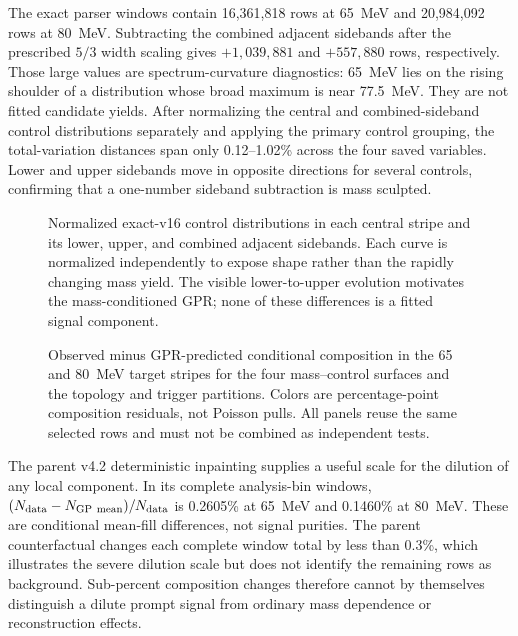 The exact parser windows contain 16,361,818 rows at 65~MeV and 20,984,092 rows
at 80~MeV.  Subtracting the combined adjacent sidebands after the prescribed
$5/3$ width scaling gives $+1,039,881$ and $+557,880$ rows, respectively.
Those large values are spectrum-curvature diagnostics: 65~MeV lies on the
rising shoulder of a distribution whose broad maximum is near 77.5~MeV.
They are not fitted candidate yields.  After normalizing the central and
combined-sideband control distributions separately and applying the primary
control grouping, the total-variation distances span only 0.12--1.02\% across
the four saved variables.  Lower and
upper sidebands move in opposite directions for several controls, confirming
that a one-number sideband subtraction is mass sculpted.

\begin{figure}[H]
\centering
{}
\caption{Normalized exact-v16 control distributions in each central stripe
and its lower, upper, and combined adjacent sidebands.  Each curve is
normalized independently to expose shape rather than the rapidly changing
mass yield.  The visible lower-to-upper evolution motivates the
mass-conditioned GPR; none of these differences is a fitted signal
component.}
\label{fig:v4p3-central-sideband-controls}
\end{figure}

\begin{figure}[H]
\centering
{}
\caption{Observed minus GPR-predicted conditional composition in the 65 and
80~MeV target stripes for the four mass--control surfaces and the topology and
trigger partitions.  Colors are percentage-point composition residuals, not
Poisson pulls.  All panels reuse the same selected rows and must not be
combined as independent tests.}
\label{fig:v4p3-conditional-residual-atlas}
\end{figure}

The parent v4.2 deterministic inpainting supplies a useful scale for the
dilution of any local component.  In its complete analysis-bin windows,
$(N_{\rm data}-N_{\rm GP\ mean})/N_{\rm data}$ is 0.2605\% at 65~MeV and
0.1460\% at 80~MeV.  These are conditional mean-fill differences, not signal
purities.  The parent counterfactual changes each complete window total by
less than 0.3\%, which illustrates the severe dilution scale but does not
identify the remaining rows as background.  Sub-percent composition changes
therefore cannot by themselves distinguish a dilute prompt signal from
ordinary mass dependence or reconstruction effects.

